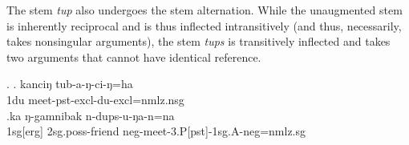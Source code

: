 \begin{table}[htp]
\begin{center}
\caption{Stem augmentation and  correspondences}\label{stem-aug}
\end{center}
\end{table}

The stem \emph{tup}  also undergoes the stem alternation. While the unaugmented stem is inherently reciprocal and is thus inflected intransitively (and thus, necessarily, takes nonsingular arguments), the stem \emph{tups} is transitively  inflected and takes two arguments that cannot have identical reference.

	 \ex. \ag. kanciŋ tub-a-ŋ-ci-ŋ=ha\\
 {\sc 1du} meet-{\sc pst-excl-du-excl=nmlz.nsg}\\
	 \bg.ka ŋ-gamnibak n-dups-u-ŋa-n=na\\
	 {\sc 1sg[erg]} {\sc 2sg.poss-}friend  {\sc neg-}meet{\sc -3.P[pst]-1sg.A-neg=nmlz.sg}\\









